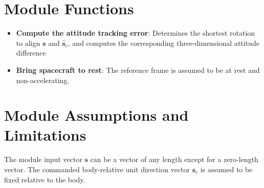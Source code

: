 

\section{Module Functions}
\begin{itemize}
	\item \textbf{Compute the attitude tracking error}: Determines the shortest rotation to align $\bm s$ and $\hat{\bm s}_{c}$, and computes the corresponding three-dimensional attitude difference
	\item \textbf{Bring spacecraft to rest}: The reference frame is assumed to be at rest and non-accelerating.  
\end{itemize}

\section{Module Assumptions and Limitations}
The module input vector $\bm s$ can be a vector of any length except for a zero-length vector.  The commanded body-relative unit direction vector ${\bm s}_{c}$ is assumed to be fixed relative to the body.  